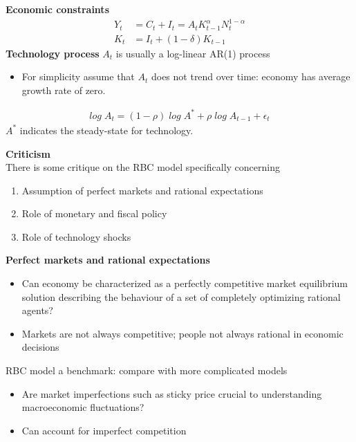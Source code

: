 \documentclass{beamer}
\begin{document}
\begin{frame}
 \textbf{Economic constraints}
\begin{align}
  Y_t &= C_t + I_t = A_tK^\alpha_{t-1}N^{1-\alpha}_t\\
  K_t &= I_t + (1-\delta)K_{t-1}
\end{align}
  \textbf{Technology process}  $A_t$ is usually a log-linear AR(1) process
   \begin{itemize}
    \item For simplicity assume that $A_t$ does not trend over time: economy has average growth rate of zero.
  \end{itemize}
 \begin{align}
  log\; A_t= (1-\rho) \;log\; A^* + \rho\; log\; A_{t-1} + \epsilon_t
\end{align}
$A^*$ indicates the steady-state for technology.
\end{frame}

\begin{frame}
  \textbf{Criticism}\\
  There is some critique on the RBC model specifically concerning
  \begin{enumerate}
    \item Assumption of perfect markets and rational expectations
    \item Role of monetary and fiscal policy
    \item Role of technology shocks
  \end{enumerate}  
\end{frame}

\begin{frame}
  \textbf{Perfect markets and rational expectations}\\  
  \begin{itemize}
    \item  Can economy be characterized as a perfectly competitive market equilibrium solution describing the behaviour of a set of
completely optimizing rational agents?
     \item Markets are not always competitive; people not always rational in economic decisions
  \end{itemize}
  \medskip
  RBC model a benchmark: compare with more complicated models
  \begin{itemize}
    \item Are market imperfections such as sticky price crucial to understanding macroeconomic fluctuations?
    \item Can account for imperfect competition
  \end{itemize}
\end{frame}
\end{document}
